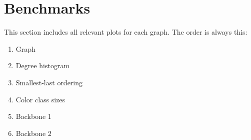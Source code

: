 \documentclass[oneside, titlepage]{scrartcl}
\begin{document}
\appendix
\section{Benchmarks}

This section includes all relevant plots for each graph. The order is always this:
\begin{enumerate}
\item
Graph
\item
Degree histogram
\item
Smallest-last ordering
\item
Color class sizes
\item
Backbone 1
\item
Backbone 2
\end{enumerate}

\FloatBarrier
\end{document}
